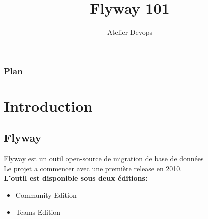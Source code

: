 \documentclass[slidestop,compress,11pt,xcolor=dvipsnames,french]{beamer}
\title[Flyway 101]{Flyway 101}
\author[Atelier Devops]{\Large Atelier Devops}
\date[Octobre 2020]{\normalsize
\begin{center}
\parbox{0cm}{\begin{tabbing}
\hspace*{2cm}\= \kill
Auteur :\> Said Mezghanni
\end{tabbing}}
\end{center}
}
\institute{L'équipe du PaaP}
\let\otp\titlepage
\renewcommand{\titlepage}{\otp\addtocounter{framenumber}{-1}}
\begin{document}
\begin{frame}[plain]
\titlepage
\end{frame}
\setcounter{framenumber}{0}
\begin{frame}
  \frametitle{Plan}

  \tableofcontents
\end{frame}
\section{Introduction}
\subsection*{Flyway}
\begin{frame}

Flyway est un outil open-source de migration de base de données \\ 
Le projet a commencer avec une première release en 2010. \\

\vspace{1cm}
\textbf {L'outil est disponible sous deux éditions:  \\}
    \begin{itemize}
        \item Community Edition
        \item Teams Edition 
    \end{itemize}
\end{frame}
\end{document}
